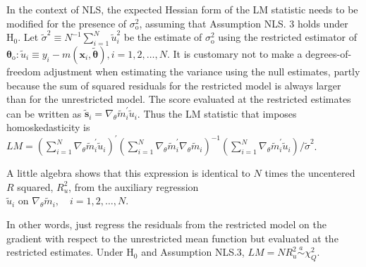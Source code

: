 \documentclass[10pt]{article}
\begin{document}
In the context of NLS, the expected Hessian form of the LM statistic needs to be modified for the presence of $\sigma_{\mathrm{o}}^{2}$, assuming that Assumption NLS. 3 holds under $\mathrm{H}_{0}$. Let $\tilde{\sigma}^{2} \equiv N^{-1} \sum_{i=1}^{N} \tilde{u}_{i}^{2}$ be the estimate of $\sigma_{\mathrm{o}}^{2}$ using the restricted estimator of $\boldsymbol{\theta}_{\mathrm{o}}: \tilde{u}_{i} \equiv y_{i}-m\left(\mathbf{x}_{i}, \tilde{\boldsymbol{\theta}}\right), i=1,2, \ldots, N$. It is customary not to make a degrees-of-freedom adjustment when estimating the variance using the null estimates, partly because the sum of squared residuals for the restricted model is always larger than for the unrestricted model. The score evaluated at the restricted estimates can be written as $\tilde{\mathbf{s}}_{i}=\nabla_{\theta} \tilde{m}_{i}^{\prime} \tilde{u}_{i}$. Thus the LM statistic that imposes homoskedasticity is\\
$L M=\left(\sum_{i=1}^{N} \nabla_{\theta} \tilde{m}_{i}^{\prime} \tilde{u}_{i}\right)^{\prime}\left(\sum_{i=1}^{N} \nabla_{\theta} \tilde{m}_{i}^{\prime} \nabla_{\theta} \tilde{m}_{i}\right)^{-1}\left(\sum_{i=1}^{N} \nabla_{\theta} \tilde{m}_{i}^{\prime} \tilde{u}_{i}\right) / \tilde{\sigma}^{2}$.

A little algebra shows that this expression is identical to $N$ times the uncentered $R$ squared, $R_{u}^{2}$, from the auxiliary regression\\
$\tilde{u}_{i}$ on $\nabla_{\theta} \tilde{m}_{i}, \quad i=1,2, \ldots, N$.

In other words, just regress the residuals from the restricted model on the gradient with respect to the unrestricted mean function but evaluated at the restricted estimates. Under $\mathrm{H}_{0}$ and Assumption NLS.3, $L M=N R_{u}^{2} \stackrel{a}{\sim} \chi_{Q}^{2}$.
\end{document}
